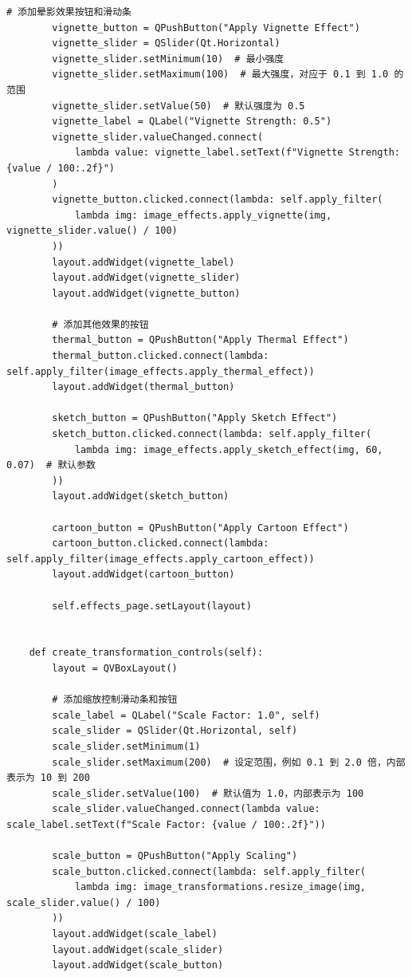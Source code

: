 \documentclass[a4paper,12pt]{article}
\begin{document}
\begin{lstlisting}[style=python]
        # 添加晕影效果按钮和滑动条
        vignette_button = QPushButton("Apply Vignette Effect")
        vignette_slider = QSlider(Qt.Horizontal)
        vignette_slider.setMinimum(10)  # 最小强度
        vignette_slider.setMaximum(100)  # 最大强度，对应于 0.1 到 1.0 的范围
        vignette_slider.setValue(50)  # 默认强度为 0.5
        vignette_label = QLabel("Vignette Strength: 0.5")
        vignette_slider.valueChanged.connect(
            lambda value: vignette_label.setText(f"Vignette Strength: {value / 100:.2f}")
        )
        vignette_button.clicked.connect(lambda: self.apply_filter(
            lambda img: image_effects.apply_vignette(img, vignette_slider.value() / 100)
        ))
        layout.addWidget(vignette_label)
        layout.addWidget(vignette_slider)
        layout.addWidget(vignette_button)

        # 添加其他效果的按钮
        thermal_button = QPushButton("Apply Thermal Effect")
        thermal_button.clicked.connect(lambda: self.apply_filter(image_effects.apply_thermal_effect))
        layout.addWidget(thermal_button)

        sketch_button = QPushButton("Apply Sketch Effect")
        sketch_button.clicked.connect(lambda: self.apply_filter(
            lambda img: image_effects.apply_sketch_effect(img, 60, 0.07)  # 默认参数
        ))
        layout.addWidget(sketch_button)

        cartoon_button = QPushButton("Apply Cartoon Effect")
        cartoon_button.clicked.connect(lambda: self.apply_filter(image_effects.apply_cartoon_effect))
        layout.addWidget(cartoon_button)

        self.effects_page.setLayout(layout)


    def create_transformation_controls(self):
        layout = QVBoxLayout()

        # 添加缩放控制滑动条和按钮
        scale_label = QLabel("Scale Factor: 1.0", self)
        scale_slider = QSlider(Qt.Horizontal, self)
        scale_slider.setMinimum(1)
        scale_slider.setMaximum(200)  # 设定范围，例如 0.1 到 2.0 倍，内部表示为 10 到 200
        scale_slider.setValue(100)  # 默认值为 1.0，内部表示为 100
        scale_slider.valueChanged.connect(lambda value: scale_label.setText(f"Scale Factor: {value / 100:.2f}"))

        scale_button = QPushButton("Apply Scaling")
        scale_button.clicked.connect(lambda: self.apply_filter(
            lambda img: image_transformations.resize_image(img, scale_slider.value() / 100)
        ))
        layout.addWidget(scale_label)
        layout.addWidget(scale_slider)
        layout.addWidget(scale_button)


\end{lstlisting}
\end{document}

